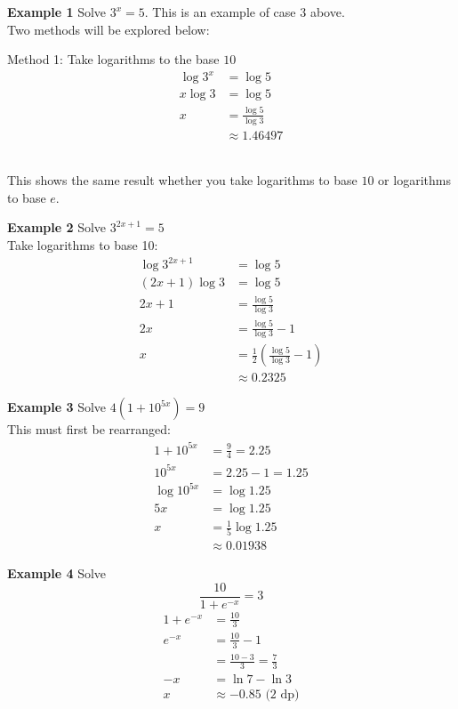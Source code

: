 \textbf{Example 1} Solve $3^{x} =5$. This is an example of case $3$ above.\medskip\\
\solution Two methods will be explored below:
\begin{multicols}{2}
Method 1: Take logarithms to the base $10$
\begin{align*}\log  3^{x} &  = \log  5 \\
x \log  3 &  = \log  5 \\
x &  = \frac{\log  5}{\log  3} \\
&  \approx 1.46497\end{align*}\\

\end{multicols}
This shows the same result whether you take logarithms to base $10$ or logarithms to base $e$. 
\begin{multicols}{2}
\textbf{Example 2}\medskip
\phantom{1}Solve $3^{2 x +1} =5$\\
\solution Take logarithms to base 10:
\begin{align*}\log  3^{2 x +1} &  = \log  5 \\
\left (2 x +1\right ) \log  3 &  = \log  5 \\
2 x +1 &  = \frac{\log  5}{\log  3} \\
2 x &  = \frac{\log  5}{\log  3} -1 \\
x &  = \frac{1}{2} \left (\frac{\log  5}{\log  3} -1\right ) \\
&  \approx 0.2325 \end{align*}

\textbf{Example 3}\medskip
\phantom{1}Solve $4 \left (1 +10^{5 x}\right ) =9$\\
\solution This must first be rearranged:
\begin{align*}1 +10^{5 x} &  = \frac{9}{4} =2.25 \\
10^{5 x} &  = 2.25 -1 =1.25 \\
\log  10^{5 x} &  = \log  1.25 \\
5 x &  = \log  1.25 \\
x &  = \frac{1}{5} \log  1.25 \\
&  \approx 0.01938 \end{align*}
\end{multicols}
\clearpage
\textbf{Example 4} Solve \[\frac{10}{1 +e^{ -x}} =3\]
\solution
\begin{align*}1 +e^{ -x} &  = \frac{10}{3} \\
e^{ -x} &  = \frac{10}{3} -1 \\
&  = \frac{10 -3}{3} =\frac{7}{3} \\
-x &  = \ln  7 -\ln  3 \\
x &  \approx  -0.85\text{ (2 dp)}\end{align*}

